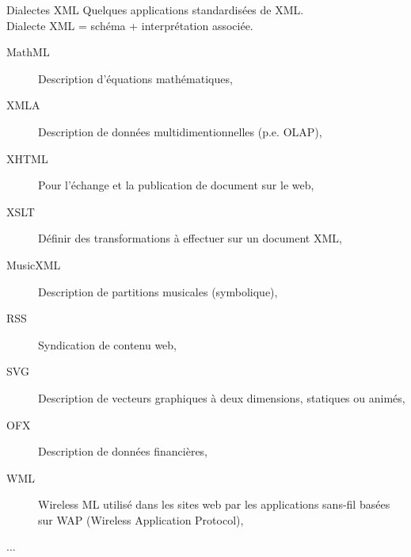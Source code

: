 \begin{frame}{Dialectes XML}
Quelques applications standardis\'ees de XML.\\
Dialecte XML = sch\'ema + interpr\'etation associ\'ee.\\

\begin{description}
\item[MathML] Description d'\'equations math\'ematiques,
\item[XMLA] Description de donn\'ees multidimentionnelles (p.e. OLAP),
\item[XHTML] Pour l'\'echange et la publication de document sur le web,
\item[XSLT] D\'efinir des transformations \`a effectuer sur un document XML,
\item[MusicXML] Description de partitions musicales (symbolique),
\item[RSS] Syndication de contenu web,
\item[SVG] Description de vecteurs graphiques \`a deux dimensions, statiques ou anim\'es,
\item[OFX] Description de donn\'ees financi\`eres,
\item[WML] Wireless ML utilis\'e dans les sites web par les applications sans-fil bas\'ees sur WAP (Wireless Application Protocol),
\item[...]
\end{description}



\end{frame}



